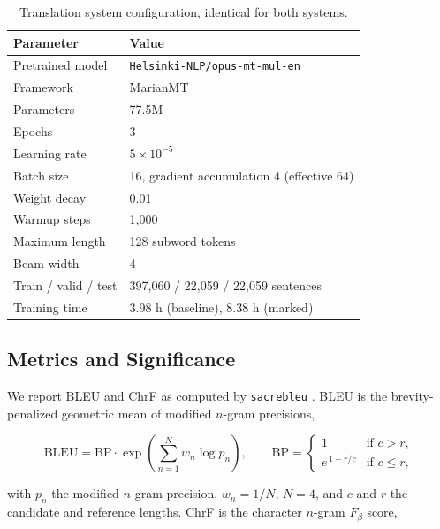 \documentclass[acmsmall,screen,review]{acmart}
\begin{document}
\begin{table}[htbp]
\centering
\caption{Translation system configuration, identical for both systems.}
\label{tab:mt_config}
\begin{tabular}{ll}
\hline
\textbf{Parameter} & \textbf{Value} \\
\hline
Pretrained model     & \texttt{Helsinki-NLP/opus-mt-mul-en} \citep{tiedemann2020opus} \\
Framework            & MarianMT \citep{junczys2018marian} \\
Parameters           & 77.5M \\
Epochs               & 3 \\
Learning rate        & $5 \times 10^{-5}$ \\
Batch size           & 16, gradient accumulation 4 (effective 64) \\
Weight decay         & 0.01 \\
Warmup steps         & 1,000 \\
Maximum length       & 128 subword tokens \\
Beam width           & 4 \\
Train / valid / test & 397,060 / 22,059 / 22,059 sentences \\
Training time        & 3.98 h (baseline), 8.38 h (marked) \\
\hline
\end{tabular}
\end{table}

\subsection{Metrics and Significance}
\label{sec:mt:metrics}

We report BLEU \citep{papineni2002bleu} and ChrF \citep{popovic2015chrf} as
computed by \texttt{sacrebleu} \citep{post2018sacrebleu}. BLEU is the
brevity-penalized geometric mean of modified $n$-gram precisions,

\begin{equation}
\label{eq:bleu}
\mathrm{BLEU} = \mathrm{BP} \cdot
\exp\left( \sum_{n=1}^{N} w_n \log p_n \right),
\qquad
\mathrm{BP} =
\begin{cases}
1 & \text{if } c > r, \\
e^{\,1 - r/c} & \text{if } c \leq r,
\end{cases}
\end{equation}

with $p_n$ the modified $n$-gram precision, $w_n = 1/N$, $N = 4$, and $c$ and
$r$ the candidate and reference lengths. ChrF is the character $n$-gram
$F_\beta$ score,
\end{document}
